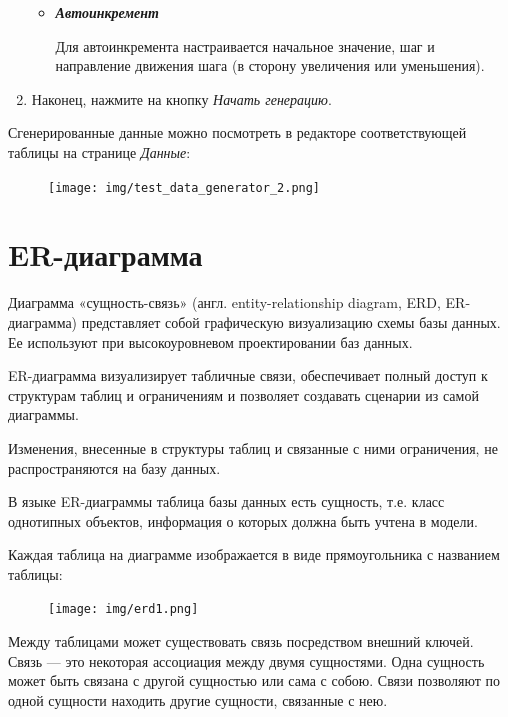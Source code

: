 \begin{enumerate}[leftmargin=39pt]
\begin{itemize}[leftmargin=10pt]
	\item \textbf{\textit{Автоинкремент}}
	
	Для автоинкремента настраивается начальное значение, шаг и направление движения шага (в сторону увеличения или уменьшения).
	
	\end{itemize}
	\item Наконец, нажмите на кнопку \textit{Начать генерацию}. 
\end{enumerate}

Сгенерированные данные можно посмотреть в редакторе соответствующей таблицы на странице \textit{Данные}:
\begin{figure}[H]
	\centering
	\texttt{[image: img/test\_data\_generator\_2.png]}
\end{figure}

\newpage

\section{ER-диаграмма}\label{sec:erd}

Диаграмма «сущность-связь» (англ. entity-relationship diagram, ERD, ER-диаграмма) представляет собой графическую визуализацию схемы базы данных. 
Ее используют при высокоуровневом проектировании баз данных. 

ER-диаграмма визуализирует табличные связи, обеспечивает полный доступ к структурам таблиц и ограничениям и позволяет создавать сценарии  из самой диаграммы.
\begin{redremark}
	Изменения, внесенные в структуры таблиц и связанные с ними ограничения, не распространяются на базу данных. 
\end{redremark}

В языке ER-диаграммы таблица базы данных есть сущность, т.е. класс однотипных объектов, информация о которых должна быть учтена в модели.

Каждая таблица на диаграмме изображается в виде прямоугольника с названием таблицы:

\begin{figure}[H]
	\centering
	\texttt{[image: img/erd1.png]}
\end{figure}

Между таблицами может существовать связь посредством внешний ключей. Связь --- это некоторая ассоциация между двумя сущностями. Одна сущность может быть связана с другой сущностью или сама с собою. Связи позволяют по одной сущности находить другие сущности, связанные с нею.

